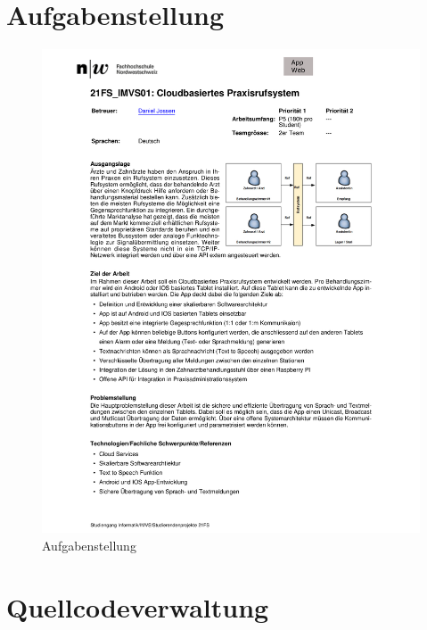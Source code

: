 \renewcommand\refname{Literaturverzeichnis}
\printbibliography
\cleardoublepage
\listoffigures


\clearpage

\appendix

\section{Aufgabenstellung}
\begin{figure}[h]
    \centering
    \begin{minipage}[b]{0.8\textwidth}
        \includegraphics[width=\textwidth]{graphics/aufgabenstellung}
        \caption{Aufgabenstellung}
    \end{minipage}
\end{figure}

\clearpage


\section{Quellcodeverwaltung}

